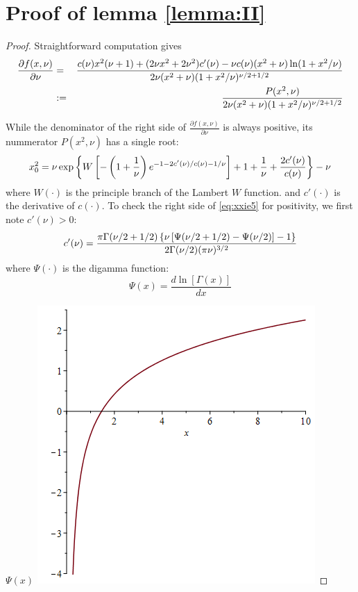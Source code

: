 \documentclass{article}
\newcommand{\td}[2]{
  \frac{d #1}{d #2}
}
\newcommand{\pd}[2]{
  \frac{\partial #1}{\partial #2}
}
\newcommand{\1}[1]{
  \mathbf{1}_{\{#1\}}
}
\begin{document}
\section{Proof of lemma \ref{lemma:II}}
\begin{proof}
  Straightforward computation gives
  \begin{eqnarray}
    \pd{f(x, \nu)}{\nu} &=& {
      c(\nu) x^2 (\nu + 1) + (2 \nu x^2 + 2 \nu^2) c'(\nu)
      -
      \nu c(\nu) (x^2 + \nu) \ln(1 + x^2/\nu)
      \over
      2 \nu (x^2 + \nu) (1 + x^2 / \nu)^{\nu/2 + 1/2}
    } \nonumber \\
    &:=& {
      P(x^2, \nu)
      \over
      2 \nu (x^2 + \nu) (1 + x^2 / \nu)^{\nu/2 + 1/2}
    }
    \label{eq:xxie4.1}
  \end{eqnarray}

  While the denominator of the right side of $\pd{f(x, \nu)}{\nu}$ is
  always positive, its nummerator $P(x^2, \nu)$ has a single root:
  \begin{equation}
    \label{eq:xxie5}
    x_0^2 = \nu\exp\left\{
      W\left[
        -\left(1 + {1 \over \nu}\right)
        e^{-1 - 2 c'(\nu)/c(\nu) - 1/\nu}
      \right]
      + 1 + {1 \over \nu} + {2 c'(\nu) \over c(\nu)}
    \right\} - \nu
  \end{equation}
  where $W(\cdot)$ is the principle branch of the Lambert $W$
  function. and $c'(\cdot)$ is the derivative of $c(\cdot)$. To check
  the right side of \eqref{eq:xxie5} for positivity, we first note
  $c'(\nu) > 0$:
  \[
  c'(\nu) = {
    \pi \Gamma(\nu/2 + 1/2) \left\{
      \nu \left[ \Psi(\nu/2 + 1/2) - \Psi(\nu/2)\right] - 1
    \right\}
    \over
    2 \Gamma(\nu/2) (\pi \nu)^{3/2}
  }
  \]
  where $\Psi(\cdot)$ is the digamma function:
  \[
  \Psi(x) = \td{\ln[\Gamma(x)]}{x}
  \]
  \begin{minipage}{0.48\textwidth}
    $\Psi(x)$ \linebreak
    \includegraphics[width=\textwidth]{digamma.png}

\end{minipage}
\end{proof}
\end{document}

